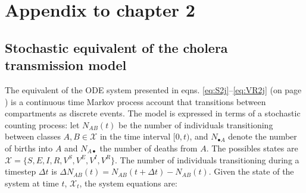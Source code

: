 \renewcommand{\thefigure}{\textsc{a}\arabic{figure}}
\renewcommand{\theequation}{\textsc{a}\arabic{equation}}
\renewcommand{\thetable}{\textsc{a}\arabic{table}}
\setcounter{figure}{0}
\setcounter{equation}{0}

\chapter{Appendix to chapter 2}
\section{Stochastic equivalent of the cholera transmission model}\label{sec:stoch}
The equivalent of the ODE system presented in eqns. \eqref{eq:S2j}--\eqref{eq:VR2j} (on page \pageref{eq:S2j}) is  a continuous time Markov process account that transitions between compartments as discrete events. The model is expressed in terms of a stochastic counting process\cite{Breto:TimeSeriesAnalysis:2009}: let \(N_{AB}(t)\) be the number of individuals
transitioning between classes \(A,B\in \mathcal{X}\) in the time
interval \([0,t)\), and \(N_{\bullet A}\) denote the number of births into \(A\) and \(N_{A\bullet}\) the number of deaths from \(A\).  The possibles states are
\(\mathcal{X} = \{S, E, I, R, V^S, V^E, V^I, V^R\}\).
The number of individuals transitioning  during a timestep $\Delta t$ is
\(\Delta N_{AB}(t) = N_{AB}(t+\Delta t) - N_{AB}(t)\). Given the state of the system at time \(t\), \(\mathcal{X}_t\), the system equations are:

